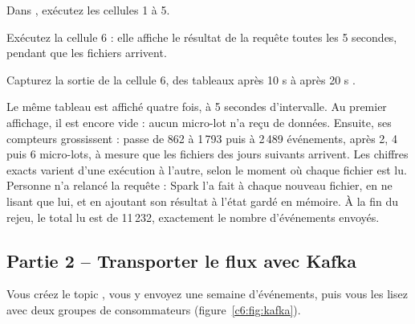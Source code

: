 \begin{obtenir}
  \item Dans , exécutez les cellules 1 à 5.
  \item Exécutez la cellule 6 : elle affiche le résultat de la requête toutes les 5 secondes, pendant que les fichiers arrivent.
  \item Capturez la sortie de la cellule 6, des tableaux \og après 10 s \fg{} à \og après 20 s \fg{}.
\end{obtenir}
\begin{lecture}
Le même tableau est affiché quatre fois, à 5 secondes d'intervalle. Au premier affichage, il est
encore vide : aucun micro-lot n'a reçu de données. Ensuite, ses compteurs grossissent :
 passe de 862 à 1\,793 puis à 2\,489 événements, après 2, 4 puis 6 micro-lots, à
mesure que les fichiers des jours suivants arrivent. Les chiffres exacts varient d'une exécution à
l'autre, selon le moment où chaque fichier est lu. Personne n'a relancé la requête : Spark l'a fait à chaque
nouveau fichier, en ne lisant que lui, et en ajoutant son résultat à l'état gardé en mémoire. À la
fin du rejeu, le total lu est de 11\,232, exactement le nombre d'événements envoyés.
\end{lecture}


\subsection*{Partie 2 -- Transporter le flux avec Kafka \hfill {}}

Vous créez le topic , vous y envoyez une semaine d'événements, puis vous les lisez
avec deux groupes de consommateurs (figure~\ref{c6:fig:kafka}).

